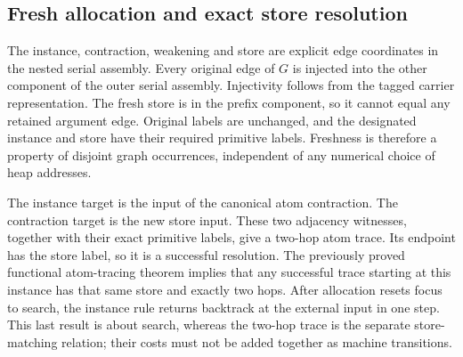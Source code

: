 




\subsection{Fresh allocation and exact store resolution}

The instance, contraction, weakening and store are explicit edge coordinates
in the nested serial assembly. Every original edge of $G$ is injected into
the other component of the outer serial assembly. Injectivity follows from
the tagged carrier representation. The fresh store is in the prefix component,
so it cannot equal any retained argument edge. Original labels are unchanged,
and the designated instance and store have their required primitive labels.
Freshness is therefore a property of disjoint graph occurrences, independent
of any numerical choice of heap addresses.











The instance target is the input of the canonical atom contraction. The
contraction target is the new store input. These two adjacency witnesses,
together with their exact primitive labels, give a two-hop atom trace. Its
endpoint has the store label, so it is a successful resolution. The previously
proved functional atom-tracing theorem implies that any successful trace
starting at this instance has that same store and exactly two hops.
After allocation resets focus to search, the instance rule returns backtrack
at the external input in one step. This last result is about search, whereas
the two-hop trace is the separate store-matching relation; their costs must
not be added together as machine transitions.

